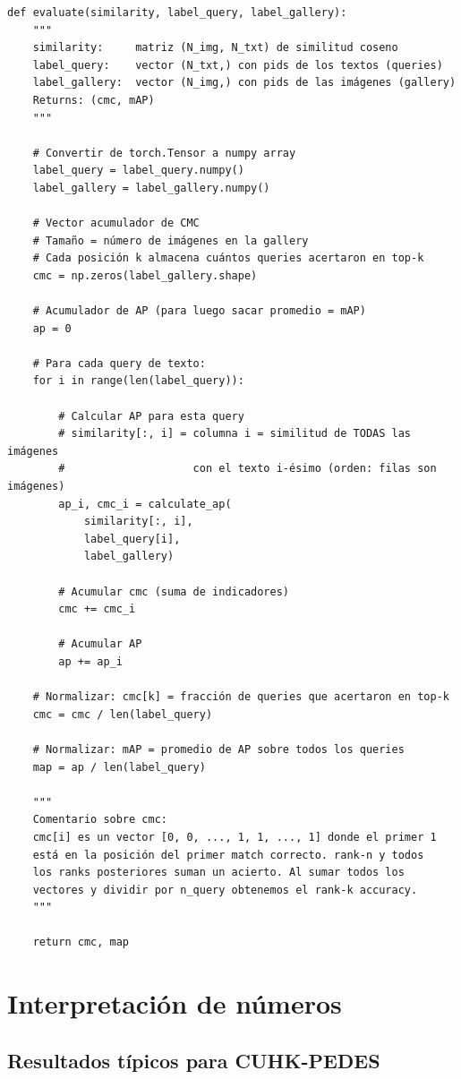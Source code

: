 \begin{verbatim}
def evaluate(similarity, label_query, label_gallery):
    """
    similarity:     matriz (N_img, N_txt) de similitud coseno
    label_query:    vector (N_txt,) con pids de los textos (queries)
    label_gallery:  vector (N_img,) con pids de las imágenes (gallery)
    Returns: (cmc, mAP)
    """

    # Convertir de torch.Tensor a numpy array
    label_query = label_query.numpy()
    label_gallery = label_gallery.numpy()

    # Vector acumulador de CMC
    # Tamaño = número de imágenes en la gallery
    # Cada posición k almacena cuántos queries acertaron en top-k
    cmc = np.zeros(label_gallery.shape)

    # Acumulador de AP (para luego sacar promedio = mAP)
    ap = 0

    # Para cada query de texto:
    for i in range(len(label_query)):

        # Calcular AP para esta query
        # similarity[:, i] = columna i = similitud de TODAS las imágenes
        #                    con el texto i-ésimo (orden: filas son imágenes)
        ap_i, cmc_i = calculate_ap(
            similarity[:, i],
            label_query[i],
            label_gallery)

        # Acumular cmc (suma de indicadores)
        cmc += cmc_i

        # Acumular AP
        ap += ap_i

    # Normalizar: cmc[k] = fracción de queries que acertaron en top-k
    cmc = cmc / len(label_query)

    # Normalizar: mAP = promedio de AP sobre todos los queries
    map = ap / len(label_query)

    """
    Comentario sobre cmc:
    cmc[i] es un vector [0, 0, ..., 1, 1, ..., 1] donde el primer 1
    está en la posición del primer match correcto. rank-n y todos
    los ranks posteriores suman un acierto. Al sumar todos los
    vectores y dividir por n_query obtenemos el rank-k accuracy.
    """

    return cmc, map
\end{verbatim}

\section{Interpretación de números}

\subsection*{Resultados típicos para CUHK-PEDES}

